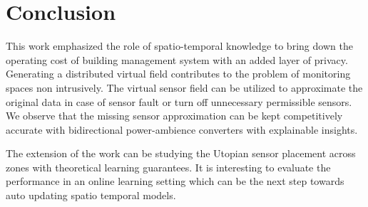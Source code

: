 \section{Conclusion}
\label{chap:conclusion}

 
This work emphasized the role of spatio-temporal knowledge to bring down the operating cost of building management system with an added layer of privacy.
Generating a distributed virtual field contributes to the problem of monitoring spaces non intrusively. 
The virtual sensor field can be utilized to approximate the original data in case of sensor fault or turn off unnecessary permissible sensors.
We observe that the missing sensor approximation can be kept competitively accurate with bidirectional power-ambience converters with explainable insights.

The extension of the work can be studying the Utopian sensor placement across zones with theoretical learning guarantees.  
It is interesting to evaluate the performance in an online learning setting which can be the next step towards auto updating spatio temporal models.

